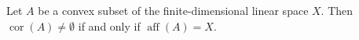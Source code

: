 Let $A$ be a convex subset of the finite-dimensional linear space $X$. Then $\operatorname{cor}(A) \neq \emptyset$ if and only if $\operatorname{aff}(A) = X$.